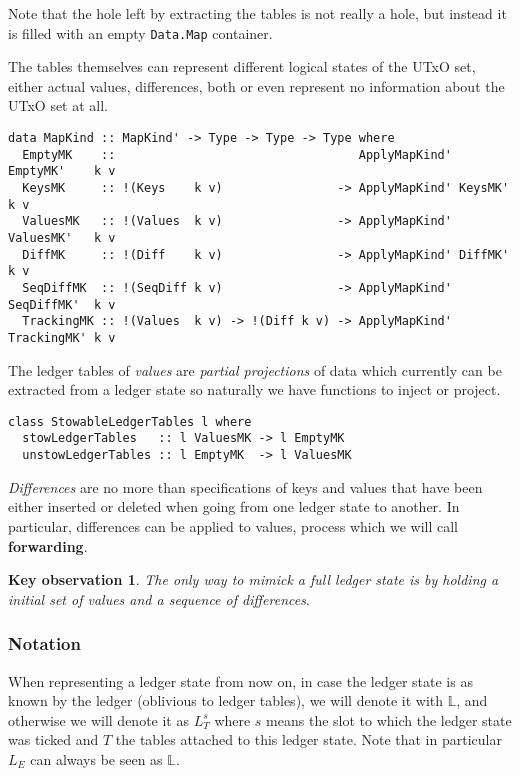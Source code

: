 \documentclass[11pt,a4paper]{article}
\theoremstyle{definition}
\newtheorem{observation}{Key observation}
\begin{document}
Note that the hole left by extracting the tables is not really a hole, but
instead it is filled with an empty \texttt{Data.Map} container.

The tables themselves can represent different logical states of the UTxO set,
either actual values, differences, both or even represent no information about
the UTxO set at all.

\begin{lstlisting}
data MapKind :: MapKind' -> Type -> Type -> Type where
  EmptyMK    ::                                  ApplyMapKind' EmptyMK'    k v
  KeysMK     :: !(Keys    k v)                -> ApplyMapKind' KeysMK'     k v
  ValuesMK   :: !(Values  k v)                -> ApplyMapKind' ValuesMK'   k v
  DiffMK     :: !(Diff    k v)                -> ApplyMapKind' DiffMK'     k v
  SeqDiffMK  :: !(SeqDiff k v)                -> ApplyMapKind' SeqDiffMK'  k v
  TrackingMK :: !(Values  k v) -> !(Diff k v) -> ApplyMapKind' TrackingMK' k v
\end{lstlisting}

The ledger tables of \emph{values} are \emph{partial projections} of data which
currently can be extracted from a ledger state so naturally we have functions to
inject or project.

\begin{lstlisting}
class StowableLedgerTables l where
  stowLedgerTables   :: l ValuesMK -> l EmptyMK
  unstowLedgerTables :: l EmptyMK  -> l ValuesMK
\end{lstlisting}

\emph{Differences} are no more than specifications of keys and values that have been
either inserted or deleted when going from one ledger state to another. In particular, differences can be applied to values, process which we will call \textbf{forwarding}.

\begin{observation}
  \label{ko1}
  \emph{The only way to mimick a full ledger state is by holding a initial set
    of values and a sequence of differences}.
\end{observation}

\subsubsection{Notation}
When representing a ledger state from now on, in case the ledger state is as
known by the ledger (oblivious to ledger tables), we will denote it with
$\mathbb{L}$, and otherwise we will denote it as $L^{s}_{T}$ where $s$ means the
slot to which the ledger state was ticked and $T$ the tables attached to this
ledger state. Note that in particular $L_{E}$ can always be seen as $\mathbb{L}$.
\end{document}
